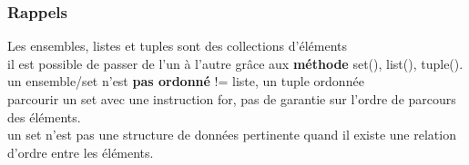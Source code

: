\begin{frame}
  \frametitle{Rappels}
   Les ensembles, listes et tuples sont des collections d’éléments\\ 
   il est possible de passer de l’un à l’autre grâce aux \textbf{méthode} set(), list(), tuple().\\
  
    un ensemble/set n’est \textbf{pas ordonné} != liste, un tuple ordonnée\\

 parcourir un set avec une instruction for, pas de garantie sur l’ordre de parcours des éléments. \\
 un set n’est pas une structure de données pertinente quand il existe une relation d’ordre entre les éléments.
\end{frame}









